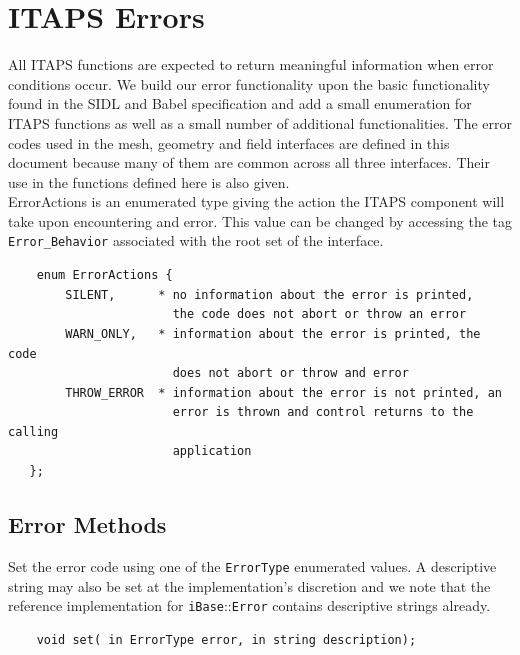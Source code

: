 \documentclass{article}
\begin{document}
\section{ITAPS Errors}\label{ch:error}

All ITAPS functions are expected to return meaningful information 
when error conditions occur. We build our error functionality 
upon the basic functionality found in the SIDL and Babel specification 
and add a small enumeration for ITAPS functions as well as a small 
number of additional functionalities. The error codes used in 
the mesh, geometry and field interfaces are defined in this document 
because many of them are common across all three interfaces. 
Their use in the functions defined here is also given. \\


ErrorActions is an enumerated type giving the action the ITAPS 
component will take upon encountering and error. This value can 
be changed by accessing the tag {\tt Error\_Behavior} associated with 
the root set of the interface.

\begin{verbatim}
    enum ErrorActions {
        SILENT,      * no information about the error is printed, 
                       the code does not abort or throw an error 
        WARN_ONLY,   * information about the error is printed, the code
                       does not abort or throw and error 
        THROW_ERROR  * information about the error is not printed, an
                       error is thrown and control returns to the calling
                       application 
   };
\end{verbatim}  


\subsection{Error Methods}

Set the error code using one of the {\tt ErrorType} enumerated values. A 
descriptive string may also be set at the implementation's discretion 
and we note that the reference implementation for {\tt iBase}::{\tt Error} 
contains descriptive strings already.
\begin{verbatim}
    void set( in ErrorType error, in string description);
\end{verbatim} 
\end{document}
